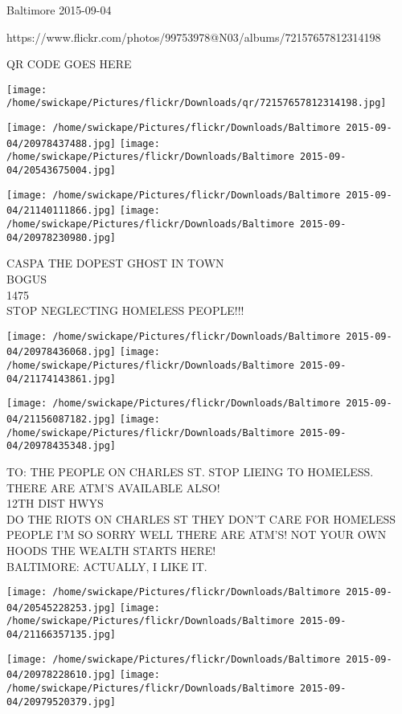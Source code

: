 \documentclass[10pt,letterpaper]{article}
\begin{document}
Baltimore 2015-09-04

https://www.flickr.com/photos/99753978@N03/albums/72157657812314198

QR CODE GOES HERE

\texttt{[image: /home/swickape/Pictures/flickr/Downloads/qr/72157657812314198.jpg]}
\pagebreak

\texttt{[image: /home/swickape/Pictures/flickr/Downloads/Baltimore 2015-09-04/20978437488.jpg]}
\texttt{[image: /home/swickape/Pictures/flickr/Downloads/Baltimore 2015-09-04/20543675004.jpg]}

\texttt{[image: /home/swickape/Pictures/flickr/Downloads/Baltimore 2015-09-04/21140111866.jpg]}
\texttt{[image: /home/swickape/Pictures/flickr/Downloads/Baltimore 2015-09-04/20978230980.jpg]}

CASPA THE DOPEST GHOST IN TOWN\\
BOGUS\\
1475\\
STOP NEGLECTING HOMELESS PEOPLE!!!\\
\pagebreak

\texttt{[image: /home/swickape/Pictures/flickr/Downloads/Baltimore 2015-09-04/20978436068.jpg]}
\texttt{[image: /home/swickape/Pictures/flickr/Downloads/Baltimore 2015-09-04/21174143861.jpg]}

\texttt{[image: /home/swickape/Pictures/flickr/Downloads/Baltimore 2015-09-04/21156087182.jpg]}
\texttt{[image: /home/swickape/Pictures/flickr/Downloads/Baltimore 2015-09-04/20978435348.jpg]}

TO: THE PEOPLE ON CHARLES ST. STOP LIEING TO HOMELESS.  THERE ARE ATM'S AVAILABLE ALSO!\\
12TH DIST HWYS\\
DO THE RIOTS ON CHARLES ST THEY DON'T CARE FOR HOMELESS PEOPLE I'M SO SORRY WELL THERE ARE ATM'S!  NOT YOUR OWN HOODS THE WEALTH STARTS HERE!\\
BALTIMORE: ACTUALLY, I LIKE IT.\\
\pagebreak

\texttt{[image: /home/swickape/Pictures/flickr/Downloads/Baltimore 2015-09-04/20545228253.jpg]}
\texttt{[image: /home/swickape/Pictures/flickr/Downloads/Baltimore 2015-09-04/21166357135.jpg]}

\texttt{[image: /home/swickape/Pictures/flickr/Downloads/Baltimore 2015-09-04/20978228610.jpg]}
\texttt{[image: /home/swickape/Pictures/flickr/Downloads/Baltimore 2015-09-04/20979520379.jpg]}
\end{document}
